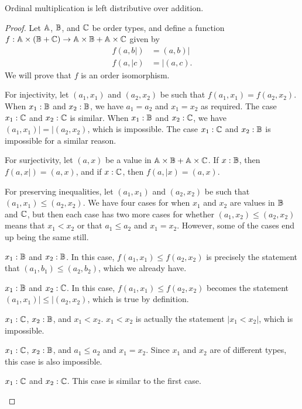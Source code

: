 \documentclass[../../math.tex]{subfiles}
\begin{document}
\begin{instance}
    Ordinal multiplication is left distributive over addition.
\end{instance}
\begin{proof}
    Let $\mathbb{A}$, $\mathbb{B}$, and $\mathbb{C}$ be order types, and define a function $f : \mathbb{A}
    \times (\mathbb{B} + \mathbb{C}) \to \mathbb{A} \times \mathbb{B} + \mathbb{A} \times \mathbb{C}$ given by
    \begin{align*}
        f(a, b|) &= (a, b)| \\
        f(a, |c) &= |(a, c).
    \end{align*}
    We will prove that $f$ is an order isomorphism.

    For injectivity, let $(a_1, x_1)$ and $(a_2, x_2)$ be such that $f(a_1, x_1)
    = f(a_2, x_2)$.  When $x_1 : \mathbb{B}$ and $x_2 : \mathbb{B}$, we have $a_1 = a_2$ and
    $x_1 = x_2$ as required.  The case $x_1 : \mathbb{C}$ and $x_2 : \mathbb{C}$ is similar.
    When $x_1 : \mathbb{B}$ and $x_2 : \mathbb{C}$, we have $(a_1, x_1)| = |(a_2, x_2)$, which
    is impossible.  The case $x_1 : \mathbb{C}$ and $x_2 : \mathbb{B}$ is impossible for a
    similar reason.

    For surjectivity, let $(a, x)$ be a value in $\mathbb{A} \times \mathbb{B} + \mathbb{A} \times \mathbb{C}$.
    If $x : \mathbb{B}$, then $f(a, x|) = (a, x)$, and if $x : \mathbb{C}$, then $f(a, |x) = (a,
    x)$.

    For preserving inequalities, let $(a_1, x_1)$ and $(a_2, x_2)$ be such that
    $(a_1, x_1) \leq (a_2, x_2)$.  We have four cases for when $x_1$ and $x_2$
    are values in $\mathbb{B}$ and $\mathbb{C}$, but then each case has two more cases for
    whether $(a_1, x_2) \leq (a_2, x_2)$ means that $x_1 < x_2$ or that $a_1
    \leq a_2$ and $x_1 = x_2$.  However, some of the cases end up being the same
    still.
    \begin{case} $x_1 : \mathbb{B}$ and $x_2 : \mathbb{B}$.
        In this case, $f(a_1, x_1) \leq f(a_2, x_2)$ is precisely the statement
        that $(a_1, b_1) \leq (a_2, b_2)$, which we already have.
    \end{case}
    \begin{case} $x_1 : \mathbb{B}$ and $x_2 : \mathbb{C}$.
        In this case, $f(a_1, x_1) \leq f(a_2, x_2)$ becomes the statement
        $(a_1, x_1)| \leq |(a_2, x_2)$, which is true by definition.
    \end{case}
    \begin{case} $x_1 : \mathbb{C}$, $x_2 : \mathbb{B}$, and $x_1 < x_2$.
        $x_1 < x_2$ is actually the statement $|x_1 < x_2|$, which is
        impossible.
    \end{case}
    \begin{case} $x_1 : \mathbb{C}$, $x_2 : \mathbb{B}$, and $a_1 \leq a_2$ and $x_1 = x_2$.
        Since $x_1$ and $x_2$ are of different types, this case is also
        impossible.
    \end{case}
    \begin{case} $x_1 : \mathbb{C}$ and $x_2 : \mathbb{C}$.
        This case is similar to the first case.
    \end{case}
\end{proof}
\end{document}
